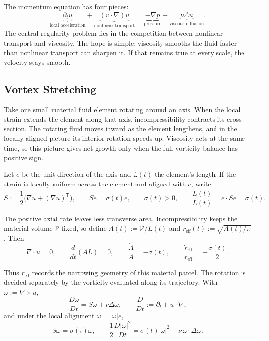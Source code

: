
The momentum equation has four pieces:
\[
  \underbrace{\partial_t u}_{\text{local acceleration}}
  +
  \underbrace{(u\cdot\nabla)u}_{\text{nonlinear transport}}
  =
  \underbrace{-\nabla p}_{\text{pressure}}
  +
  \underbrace{\nu\Delta u}_{\text{viscous diffusion}}.
\]
The central regularity problem lies in the competition between nonlinear transport and viscosity.
The hope is simple: viscosity smooths the fluid faster than nonlinear transport can sharpen it.
If that remains true at every scale, the velocity stays smooth.

\subsection{Vortex Stretching}\label{sub:ThePerfectlyStretchingVortex}

Take one small material fluid element rotating around an axis. When the local strain extends the element along that axis, incompressibility contracts its cross-section. The rotating fluid moves inward as the element lengthens, and in the locally aligned picture its interior rotation speeds up. Viscosity acts at the same time, so this picture gives net growth only when the full vorticity balance has positive sign.

Let \(e\) be the unit direction of the axis and \(L(t)\) the element's length. If the strain is locally uniform across the element and aligned with \(e\), write
\[
  S:=\frac12\bigl(\nabla u+(\nabla u)^{\mathsf T}\bigr),
  \qquad
  Se=\sigma(t)e,
  \qquad
  \sigma(t)>0,
  \qquad
  \frac{\dot L(t)}{L(t)}
  =
  e\cdot Se
  =
  \sigma(t).
\]

The positive axial rate leaves less transverse area. Incompressibility keeps the material volume \(\mathcal V\) fixed, so define \(A(t):=\mathcal V/L(t)\) and \(r_{\mathrm{eff}}(t):=\sqrt{A(t)/\pi}\). Then
\[
  \nabla\cdot u=0,
  \qquad
  \frac{d}{dt}(A L)=0,
  \qquad
  \frac{\dot A}{A}=-\sigma(t),
  \qquad
  \frac{\dot r_{\mathrm{eff}}}{r_{\mathrm{eff}}}
  =
  -\frac{\sigma(t)}{2}.
\]

Thus \(r_{\mathrm{eff}}\) records the narrowing geometry of this material parcel. The rotation is decided separately by the vorticity evaluated along its trajectory. With \(\omega:=\nabla\times u\),
\[
  \frac{D\omega}{Dt}
  =
  S\omega+\nu\Delta\omega,
  \qquad
  \frac{D}{Dt}
  :=
  \partial_t+u\cdot\nabla,
\]
and under the local alignment \(\omega=|\omega|e\),
\[
  S\omega
  =
  \sigma(t)\omega,
  \qquad
  \frac12\frac{D|\omega|^2}{Dt}
  =
  \sigma(t)|\omega|^2
  +
  \nu\,\omega\cdot\Delta\omega.
\]

